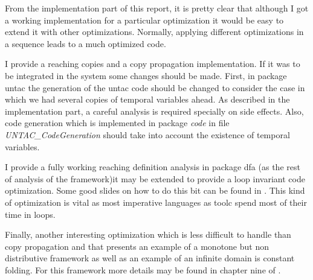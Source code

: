 From the implementation part of this report, it is pretty clear that although I got a working implementation for a particular optimization it would be easy to extend it with other optimizations. Normally, applying different optimizations in a sequence leads to a much optimized code. 

I provide a reaching copies and a copy propagation implementation. If it was to be integrated in the system some changes should be made. First, in package untac the generation of the untac code should be changed to consider the case in which we had several copies of temporal variables ahead. As described in the implementation part, a careful analysis is required specially on side effects. Also, code generation which is implemented in package \emph{code} in file \emph{UNTAC\_CodeGeneration} should take into account the existence of temporal variables. 

I provide a fully working reaching definition analysis in package dfa (as the rest of analysis of the framework)it may be extended to provide a loop invariant code optimization. Some good slides on how to do this bit can be found in \cite{LoopSlides}. This kind of optimization is vital as most imperative languages as toolc spend most of their time in loops. 

Finally, another interesting optimization which is less difficult to handle than copy propagation and that presents an example of a monotone but non distributive framework as well as an example of an infinite domain is constant folding. For this framework more details may be found in chapter nine of \cite{DragonBook}.